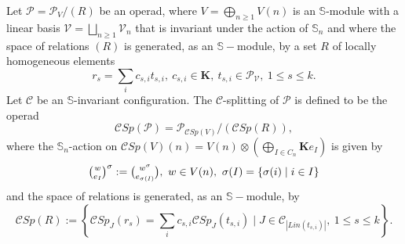 \documentclass[11pt, twoside]{article}
\begin{document}
\begin{defi}
    Let $\mathcal{P}=\mathcal{P}_V/(R) $ be an operad, where $V=\bigoplus\limits_{n\geq 1}V(n) $ is an $\mathbb{S} $-module with a linear basis $\mathcal{V}=\bigsqcup\limits_{n\geq 1}\mathcal{V}_n $  that is invariant under the action of $\mathbb{S}_n $ and where the space of relations $(R)$ is generated, as an $\mathbb{S}- $module, by a set $R$ of locally homogeneous elements $$r_s= \sum\limits_{i}c_{s,i}t_{s,i}, \ c_{s,i}\in \mathbf{K}, \ t_{s,i}\in \mathcal{P}_\mathcal{V}, \ 1\leq s\leq k. $$ Let $\mathcal{C} $ be an $\mathbb{S} $-invariant configuration. The $\mathcal{C}$-splitting of $\mathcal{P} $ is defined to be the operad $$\mathcal{C}Sp(\mathcal{P})= \mathcal{P}_{\mathcal{C}Sp(V)}/(\mathcal{C}Sp(R)), $$ where the $\mathbb{S}_n $-action on $\mathcal{C}Sp(V)(n)=V(n)\otimes (\bigoplus\limits_{I\in C_n}\mathbf{K}e_I) $ is given by $$\tbinom{w}{e_I}^\sigma:= \tbinom{w^{\sigma}}{e_{\sigma(I)}}, \ w\in V(n), \ \sigma(I)= \left\{\sigma(i)\mid i\in I \right\}  $$ and the space of relations is generated, as an $\mathbb{S}- $module, by $$\mathcal{C}Sp(R):= \left\{\mathcal{C}Sp_J(r_s)= \sum\limits_{i}c_{s,i}\mathcal{C}Sp_J(t_{s,i}) \mid J\in \mathcal{C}_{\left | Lin(t_{s,i})\right |}, \ 1\leq s\leq k \right\}. $$
\end{defi}
\end{document}
